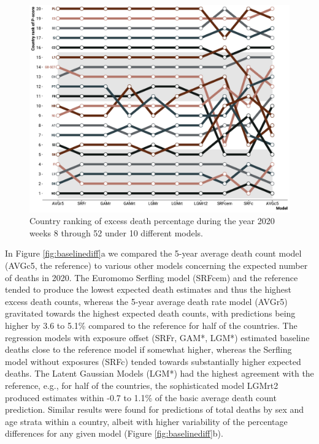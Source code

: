 \documentclass[12pt]{article}
\begin{document}
\begin{figure}
\caption{Country ranking of excess death percentage during the year 2020 weeks 8 through 52 under 10 different models.}
\label{fig:rank}
\includegraphics{rank.pdf}
\end{figure}

In Figure \ref{fig:baselinediff}a we compared the 5-year average death count model (AVGc5, the reference) to various other models concerning the expected number of deaths in 2020. The Euromomo Serfling model (SRFcem) and the reference tended to produce the lowest expected death estimates and thus the highest excess death counts, whereas the 5-year average death rate model (AVGr5) gravitated towards the highest expected death counts, with predictions being higher by 3.6 to 5.1\% compared to the reference for half of the countries. The regression models with exposure offset (SRFr, GAM*, LGM*) estimated baseline deaths close to the reference model if somewhat higher, whereas the Serfling model without exposures (SRFc) tended towards substantially higher expected deaths. The Latent Gaussian Models (LGM*) had the highest agreement with the reference, e.g., for half of the countries, the sophisticated model LGMrt2 produced estimates within -0.7 to 1.1\% of the basic average death count prediction. Similar results were found for predictions of total deaths by sex and age strata within a country, albeit with higher variability of the percentage differences for any given model (Figure \ref{fig:baselinediff}b).
\end{document}
